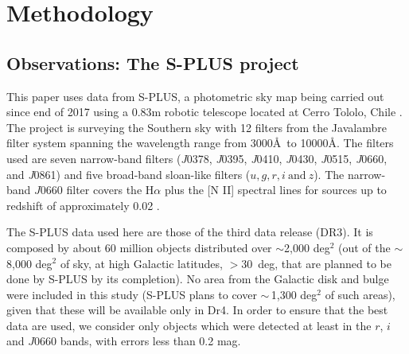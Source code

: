 \documentclass[fleqn,usenatbib]{mnras}
\begin{document}

\section{Methodology}
\label{sec:metho}
\subsection{Observations: The S-PLUS project}
\label{sec:obser}

This paper uses data from S-PLUS, a photometric sky map being carried 
out since end of 2017 using a 0.83m robotic telescope located at Cerro 
Tololo, Chile \citep{Mendes:2019}.
The project is surveying the Southern sky with 12 filters from the Javalambre 
filter system \citep{Martin-Franch:2012} spanning the wavelength range from 3000\AA\ 
to 10000\AA. The filters used are seven narrow-band filters
(\textit{J}0378, \textit{J}0395, \textit{J}0410, \textit{J}0430,
\textit{J}0515, \textit{J}0660,  and \textit{J}0861) 
and
five broad-band sloan-like \citep{Fukugita:1996} filters (\(u, g, r, i~\mathrm{and}~z\)).
The narrow-band $J0660$ filter  covers 
the H{$\alpha$} plus the [N II] spectral lines for sources up to redshift of approximately 0.02 \citep[see Fig. 1 after][]{Martin-Franch:2012}. 

The S-PLUS data used here are those of the third data release (DR3). It is composed by about 60 million objects distributed over $\sim$2,000 deg$^2$ (out of the $\sim$8,000 deg$^2$ of sky, at high Galactic latitudes, $ > 30$~deg, that are planned to be done by S-PLUS by its completion). No area from the Galactic disk and bulge were included in this study (S-PLUS plans to cover $\sim$\,1,300 deg$^2$ of such areas), given that these will be available only in Dr4.
In order to ensure that the best data are used, we consider only objects which were detected at least in the $r$, $i$ and
  $J0660$ bands, 
  with errors less than 0.2 mag.
\end{document}
